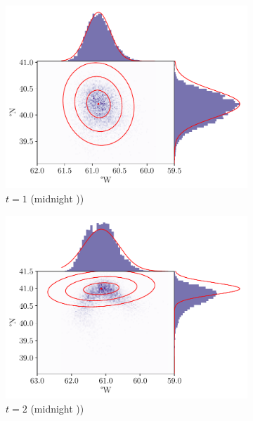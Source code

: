 \begin{figure}
	\begin{center}
		\begin{subfigure}{0.49\textwidth}
			\includegraphics[width=\textwidth]{chp06_applications/figures/gulf_stream/traj_stoch_em_1.0}
			\caption{\(t = 1\) (midnight ))}
		\end{subfigure}
		\begin{subfigure}{0.49\textwidth}
			\includegraphics[width=\textwidth]{chp06_applications/figures/gulf_stream/traj_stoch_em_2.0}
			\caption{\(t = 2\) (midnight ))}
		\end{subfigure}
		\begin{subfigure}{0.49\textwidth}

\end{subfigure}
\end{center}
\end{figure}
